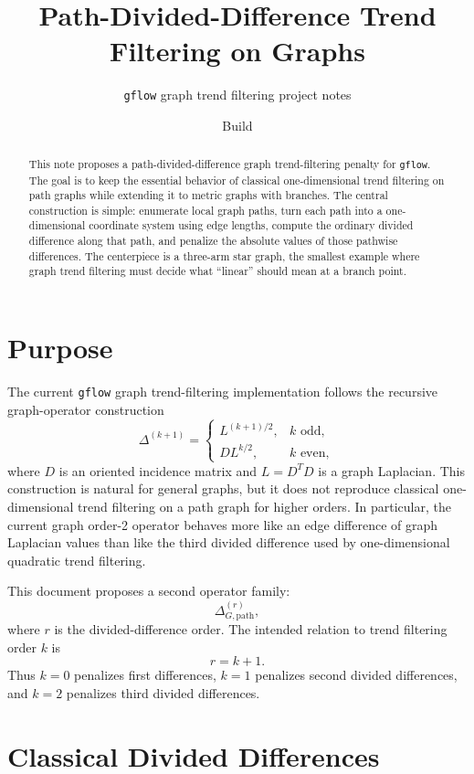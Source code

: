 \documentclass[11pt]{article}
\title{Path-Divided-Difference Trend Filtering on Graphs}
\author{\texttt{gflow} graph trend filtering project notes}
\date{Build \reportbuilddatetime}
\begin{document}
\maketitle

\begin{abstract}
This note proposes a path-divided-difference graph trend-filtering penalty for
\texttt{gflow}.  The goal is to keep the essential behavior of classical
one-dimensional trend filtering on path graphs while extending it to metric
graphs with branches.  The central construction is simple: enumerate local
graph paths, turn each path into a one-dimensional coordinate system using edge
lengths, compute the ordinary divided difference along that path, and penalize
the absolute values of those pathwise differences.  The centerpiece is a
three-arm star graph, the smallest example where graph trend filtering must
decide what ``linear'' should mean at a branch point.
\end{abstract}

\section{Purpose}

The current \texttt{gflow} graph trend-filtering implementation follows the
recursive graph-operator construction
\[
  \Delta^{(k+1)}
  =
  \begin{cases}
  L^{(k+1)/2}, & k \text{ odd},\\
  D L^{k/2}, & k \text{ even},
  \end{cases}
\]
where \(D\) is an oriented incidence matrix and \(L=D^TD\) is a graph
Laplacian.  This construction is natural for general graphs, but it does not
reproduce classical one-dimensional trend filtering on a path graph for higher
orders.  In particular, the current graph order-2 operator behaves more like
an edge difference of graph Laplacian values than like the third divided
difference used by one-dimensional quadratic trend filtering.

This document proposes a second operator family:
\[
  \Delta^{(r)}_{G,\mathrm{path}},
\]
where \(r\) is the divided-difference order.  The intended relation to trend
filtering order \(k\) is
\[
  r = k+1.
\]
Thus \(k=0\) penalizes first differences, \(k=1\) penalizes second divided
differences, and \(k=2\) penalizes third divided differences.

\section{Classical Divided Differences}
\end{document}

